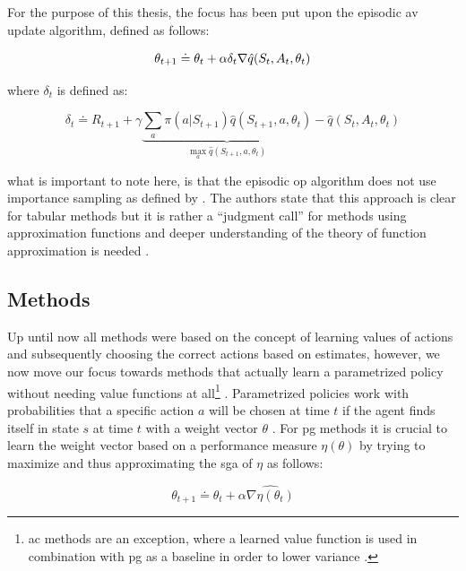 For the purpose of this thesis, the focus has been put upon the episodic \gls{av} update algorithm, defined as follows:

\begin{equation}
	\theta_{t+1} \doteq \theta_t + \alpha \delta_t \nabla \hat{q} (S_t,A_t,\theta_t)\\
\end{equation}

where $\delta_t$ is defined as:

\begin{equation}
	\delta_t \doteq R_{t+1} + \gamma \underbrace{\sum_a \pi (a|S_{t+1}) \hat{q} (S_{t+1},a,\theta_t)}_{\max_a \hat{q} (S_{t+1},a,\theta_t)} - \hat{q} (S_t,A_t,\theta_t)
\end{equation}

what is important to note here, is that the episodic \gls{op} algorithm does not use importance sampling as defined by  \citep[p. 244]{Sutton2017}. The authors state that this approach is clear for tabular methods but it is rather a ``judgment call'' for methods using approximation functions and deeper understanding of the theory of function approximation is needed \citep[p. 244]{Sutton2017}.

\subsection{ Methods}
\label{subsec:polgrad_methods}

Up until now all methods were based on the concept of learning values of actions and subsequently choosing the correct actions based on estimates, however, we now move our focus towards methods that actually learn a parametrized policy without needing value functions at all\footnote{\gls{ac} methods are an exception, where a learned value function is used in combination with \gls{pg} as a baseline in order to lower variance \citep{Sutton2017}.}  \citep[p. 265]{Sutton2017}. Parametrized policies work with probabilities that a specific action $a$ will be chosen at time $t$ if the agent finds itself in state $s$ at time $t$ with a weight vector $\theta$ \citep[p. 265]{Sutton2017}. For \gls{pg} methods it is crucial to learn the weight vector based on a performance measure $\eta(\theta)$ by trying to maximize and thus approximating the \gls{sga} of $\eta$ as follows:

\begin{equation}
	\theta_{t+1} \doteq \theta_t + \alpha \widehat{\nabla \eta (\theta_t)}
\end{equation}

